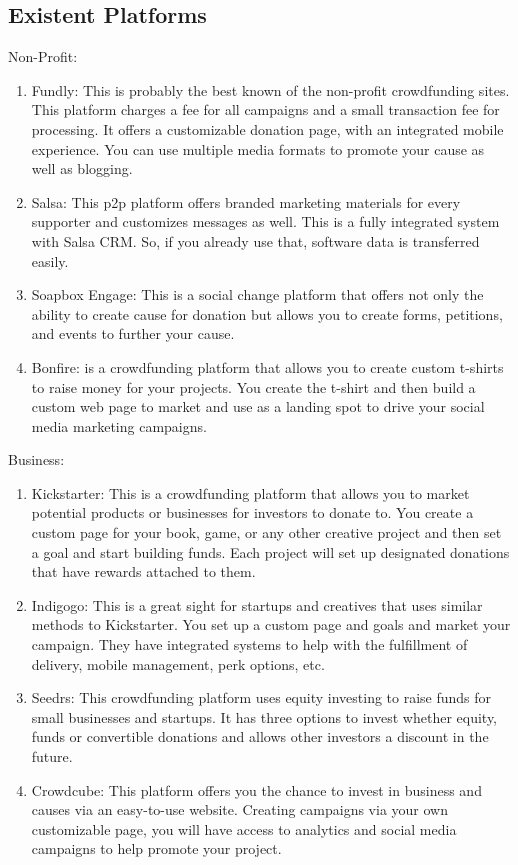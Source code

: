 \subsection*{ Existent Platforms }
Non-Profit:
\begin{enumerate}
    \item
          Fundly: This is probably the best known of the non-profit crowdfunding sites. This platform charges a fee for all campaigns and a small transaction fee for processing. It offers a customizable donation page, with an integrated mobile experience. You can use multiple media formats to promote your cause as well as blogging.
    \item
          Salsa: This p2p platform offers branded marketing materials for every supporter and customizes messages as well. This is a fully integrated system with Salsa CRM. So, if you already use that, software data is transferred easily.
    \item
          Soapbox Engage: This is a social change platform that offers not only the ability to create cause for donation but allows you to create forms, petitions, and events to further your cause.
    \item
          Bonfire: is a crowdfunding platform that allows you to create custom t-shirts to raise money for your projects. You create the t-shirt and then build a custom web page to market and use as a landing spot to drive your social media marketing campaigns.
\end{enumerate}
Business:
\begin{enumerate}
    \item
          Kickstarter: This is a crowdfunding platform that allows you to market potential products or businesses for investors to donate to. You create a custom page for your book, game, or any other creative project and then set a goal and start building funds. Each project will set up designated donations that have rewards attached to them.
    \item
          Indigogo: This is a great sight for startups and creatives that uses similar methods to Kickstarter. You set up a custom page and goals and market your campaign. They have integrated systems to help with the fulfillment of delivery, mobile management, perk options, etc.
    \item
          Seedrs: This crowdfunding platform uses equity investing to raise funds for small businesses and startups. It has three options to invest whether equity, funds or convertible donations and allows other investors a discount in the future.
    \item
          Crowdcube: This platform offers you the chance to invest in business and causes via an easy-to-use website. Creating campaigns via your own customizable page, you will have access to analytics and social media campaigns to help promote your project.
\end{enumerate}




